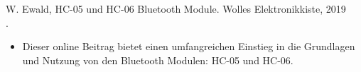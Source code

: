 W. Ewald, HC-05 und HC-06 Bluetooth Module. Wolles Elektronikkiste, 2019\\ .
\cite{WollesElektronikkiste:2019}
\begin{itemize}
	\item Dieser online Beitrag bietet einen umfangreichen Einstieg in die Grundlagen und Nutzung von den Bluetooth Modulen: HC-05 und HC-06.
\end{itemize}





